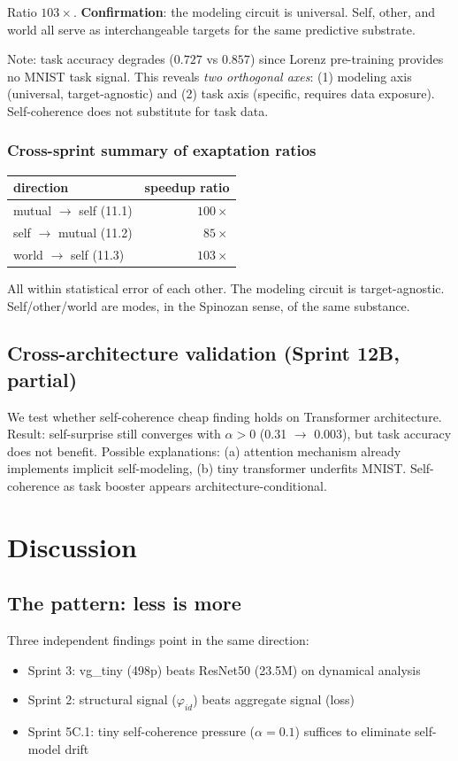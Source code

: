 \documentclass[11pt]{article}
\begin{document}
Ratio $103\times$. \textbf{Confirmation}: the modeling circuit is universal. Self, other, and world all serve as interchangeable targets for the same predictive substrate.

Note: task accuracy degrades ($0.727$ vs $0.857$) since Lorenz pre-training provides no MNIST task signal. This reveals \emph{two orthogonal axes}: (1) modeling axis (universal, target-agnostic) and (2) task axis (specific, requires data exposure). Self-coherence does not substitute for task data.

\subsubsection*{Cross-sprint summary of exaptation ratios}

\begin{table}[h]\centering
\begin{tabular}{lr}
\toprule
direction & speedup ratio \\
\midrule
mutual $\to$ self (11.1) & $100\times$ \\
self $\to$ mutual (11.2) & $85\times$ \\
world $\to$ self (11.3) & $103\times$ \\
\bottomrule
\end{tabular}
\end{table}

All within statistical error of each other. The modeling circuit is target-agnostic. Self/other/world are modes, in the Spinozan sense, of the same substance.

\subsection{Cross-architecture validation (Sprint 12B, partial)}

We test whether self-coherence cheap finding holds on Transformer architecture. Result: self-surprise still converges with $\alpha > 0$ (0.31 $\to$ 0.003), but task accuracy does not benefit. Possible explanations: (a) attention mechanism already implements implicit self-modeling, (b) tiny transformer underfits MNIST. Self-coherence as task booster appears architecture-conditional.

\section{Discussion}

\subsection{The pattern: less is more}
Three independent findings point in the same direction:
\begin{itemize}
    \item Sprint 3: vg\_tiny (498p) beats ResNet50 (23.5M) on dynamical analysis
    \item Sprint 2: structural signal ($\varphi_{id}$) beats aggregate signal (loss)
    \item Sprint 5C.1: tiny self-coherence pressure ($\alpha{=}0.1$) suffices to eliminate self-model drift
\end{itemize}
\end{document}
